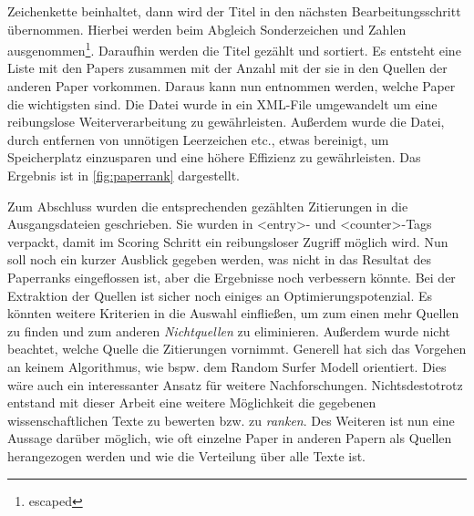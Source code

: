 Zeichenkette beinhaltet, dann wird der Titel in den nächsten
Bearbeitungsschritt übernommen. Hierbei werden beim Abgleich
Sonderzeichen und Zahlen ausgenommen\footnote{escaped}.  Daraufhin
werden die Titel gezählt und sortiert. Es entsteht eine Liste mit den
Papers zusammen mit der Anzahl mit der sie in den Quellen der anderen
Paper vorkommen. Daraus kann nun entnommen werden, welche Paper die
wichtigsten sind. Die Datei wurde in ein XML-File umgewandelt um eine
reibungslose Weiterverarbeitung zu gewährleisten. Außerdem wurde die
Datei, durch entfernen von unnötigen Leerzeichen etc., etwas
bereinigt, um Speicherplatz einzusparen und eine höhere Effizienz zu
gewährleisten. Das Ergebnis ist in \autoref{fig:paperrank}
dargestellt.







Zum Abschluss wurden die entsprechenden gezählten Zitierungen in die
Ausgangsdateien geschrieben. Sie wurden in <entry>- und <counter>-Tags
verpackt, damit im Scoring Schritt ein reibungsloser Zugriff möglich
wird.  Nun soll noch ein kurzer Ausblick gegeben werden, was nicht in
das Resultat des Paperranks eingeflossen ist, aber die Ergebnisse noch
verbessern könnte. Bei der Extraktion der Quellen ist sicher noch
einiges an Optimierungspotenzial. Es könnten weitere Kriterien in die
Auswahl einfließen, um zum einen mehr Quellen zu finden und zum
anderen \emph{Nichtquellen} zu eliminieren. Außerdem wurde nicht
beachtet, welche Quelle die Zitierungen vornimmt. Generell hat sich
das Vorgehen an keinem Algorithmus, wie bspw. dem Random Surfer Modell
orientiert. Dies wäre auch ein interessanter Ansatz für weitere
Nachforschungen.  Nichtsdestotrotz entstand mit dieser Arbeit eine
weitere Möglichkeit die gegebenen wissenschaftlichen Texte zu bewerten
bzw. zu \emph{ranken}. Des Weiteren ist nun eine Aussage darüber
möglich, wie oft einzelne Paper in anderen Papern als Quellen
herangezogen werden und wie die Verteilung über alle Texte ist.




